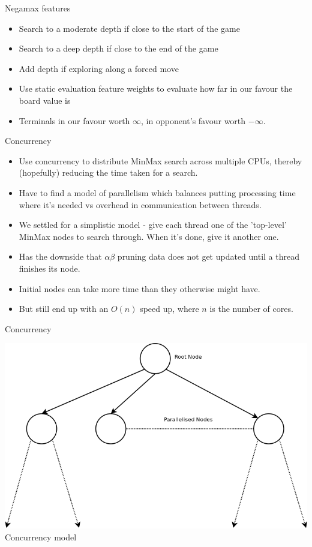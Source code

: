 \documentclass{beamer}
\begin{document}
\begin{frame}{Negamax features}
    \begin{itemize}
  \item
    Search to a moderate depth if close to the start of the game
  \item
    Search to a deep depth if close to the end of the game
  \item
    Add depth if exploring along a forced move
  \item
    Use static evaluation feature weights to evaluate how far in our favour the board value is
  \item
    Terminals in our favour worth $\infty$, in opponent's favour worth $-\infty$.
  \end{itemize}
\end{frame}

\begin{frame}{Concurrency}
    \begin{itemize}
  \item
	Use concurrency to distribute MinMax search across multiple CPUs, thereby (hopefully) reducing the time taken for a search.
 \item
	Have to find a model of parallelism which balances putting processing time where it's needed vs overhead in communication between threads.
 \item
	We settled for a simplistic model - give each thread one of the 'top-level' MinMax nodes to search through. When it's done, give it another one.
 \item
	Has the downside that $\alpha \beta$ pruning data does not get updated until a thread finishes its node.
 \item
	Initial nodes can take more time than they otherwise might have.
 \item
	But still end up with an $O(n)$ speed up, where $n$ is the number of cores.
  \end{itemize}
\end{frame}

\begin{frame}{Concurrency}
\begin{center}
\includegraphics[scale=0.35]{concurrency.png}
\\Concurrency model
\end{center}
\end{frame}
\end{document}
